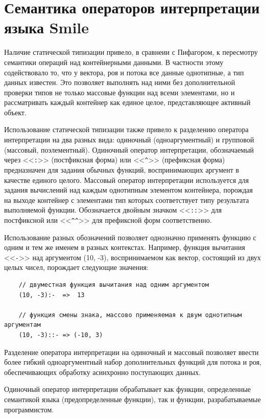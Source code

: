 \chapter{Семантика операторов интерпретации языка Smile}
\label{semantics}

Наличие статической типизации привело, в сравнеии с Пифагором, к пересмотру семантики операций над контейнерными данными. В частности этому содействовало то, что у вектора, роя и потока все данные однотипные, а тип данных известен. Это позволяет выполнять над ними без дополнительной проверки типов не только массовые функции над всеми элементами, но и рассматривать каждый контейнер как единое целое, представляющее активный объект.

Использование статической типизации также привело к разделению оператора интерпретации на два разных вида: одиночный (одноаргументный) и групповой (массовый, поэлементный). Одиночный оператор интерпретации, обозначаемый через <<\verb|:|>> (постфиксная форма) или <<\verb|^|>> (префиксная форма) предназначен для задания обычных функций, воспринимающих аргумент в качестве единого целого. Массовый оператор интерпретации используется для задания вычислений над каждым однотипным элементом контейнера, порождая на выходе контейнер с элементами тип которых соответствует типу результата выполняемой функции. Обозначается двойным значком <<\verb|::|>> для постфиксной или <<\verb|^^|>> для префиксной форм соответственно.

Использование разных обозначений позволяет однозначно применять функцию с одним и тем же именем в разных контекстах. Например, функция вычитания <<\verb|-|>> над аргументом (10, -3), воспринимаемом как вектор, состоящий из двух целых чисел, порождает следующие значения:
\begin{verbatim}
    // двуместная функция вычитания над одним аргументом
    (10, -3):-  =>  13

    // функция смены знака, массово применяемая к двум однотипным аргументам
    (10, -3)::- => (-10, 3)
\end{verbatim}

Разделение оператора интерпретации на одиночный и массовый позволяет ввести более гибкий одноаргументный набор дополнительных функций для потока и роя, обеспечивающих обработку асинхронно поступающих данных.

Одиночный оператор интерпретации обрабатывает как функции, определенные семантикой языка (предопределенные функции), так и функции, разрабатываемые программистом.

